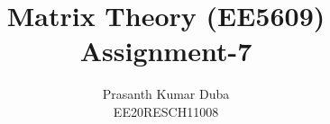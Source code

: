 \documentclass[journal,12pt,twocolumn]{IEEEtran}
\begin{document}
\makeatletter
{}
\makeatother
\let\StandardTheFigure\thefigure
\let\vec\mathbf
\renewcommand{\thefigure}{\theproblem}
\def\putbox#1#2#3{\makebox[0in][l]{\makebox[#1][l]{}\raisebox{\baselineskip}[0in][0in]{\raisebox{#2}[0in][0in]{#3}}}}
     \def\rightbox#1{\makebox[0in][r]{#1}}
     \def\centbox#1{\makebox[0in]{#1}}
     \def\topbox#1{\raisebox{-\baselineskip}[0in][0in]{#1}}
     \def\midbox#1{\raisebox{-0.5\baselineskip}[0in][0in]{#1}}
\vspace{3cm}
\title{Matrix Theory (EE5609) \\ Assignment-7}
\author{Prasanth Kumar Duba \\ EE20RESCH11008}
%
%
%
% 
%
\end{document}
